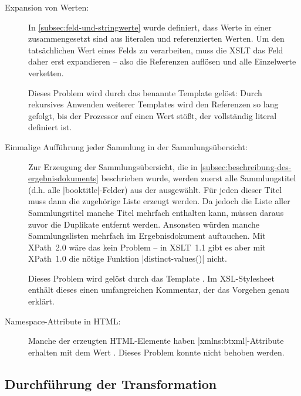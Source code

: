 \begin{description}
    \item[Expansion von Werten:] In \autoref{subsec:feld-und-stringwerte} wurde
        definiert, dass Werte in einer \BibTeXXMLdatabase{} zusammengesetzt sind
        aus literalen und referenzierten Werten. Um den tatsächlichen Wert eines
        Felds zu verarbeiten, muss die XSLT das Feld daher erst expandieren --
        also die Referenzen auflösen und alle Einzelwerte verketten.
        
        Dieses Problem wird durch das benannte Template
        \xsltemplateexpandvalue{} gelöst: Durch rekursives Anwenden weiterer
        Templates wird den Referenzen so lang gefolgt, bis der Prozessor auf
        einen Wert stößt, der vollständig literal definiert ist.
    \item[Einmalige Aufführung jeder Sammlung in der Sammlungsübersicht:]
        Zur Erzeugung der Sammlungsübersicht, die in
        \autoref{subsec:beschreibung-des-ergebnisdokuments} beschrieben wurde,
        werden zuerst alle Sammlungstitel (d.h. alle
        \mbox{\lstinlineplain|booktitle|-}Felder) aus der \BibTeXXMLdatabase{}
        ausgewählt. Für jeden dieser Titel muss dann die zugehörige Liste
        erzeugt werden. Da jedoch die Liste aller Sammlungstitel manche Titel
        mehrfach enthalten kann, müssen daraus zuvor die Duplikate entfernt
        werden. Ansonsten würden manche Sammlungslisten mehrfach im
        Ergebnisdokument auftauchen. Mit XPath~2.0 wäre das kein Problem -- in
        XSLT~1.1 gibt es aber mit XPath~1.0 die nötige Funktion
        \lstinlineplain|distinct-values()| nicht.
        
        Dieses Problem wird gelöst durch das Template
        \xsltemplatecollectionoverview{}. Im XSL-Stylesheet enthält dieses
        einen umfangreichen Kommentar, der das Vorgehen genau erklärt.
    \item[Namespace-Attribute in HTML:] Manche der erzeugten HTML-Elemente
        haben \mbox{\lstinlineXML|xmlns:btxml|-}Attribute erhalten mit dem Wert
        \BibTeXXMLnamespace{}. Dieses Problem konnte nicht behoben werden.
\end{description}

\subsection{Durchführung der Transformation}

